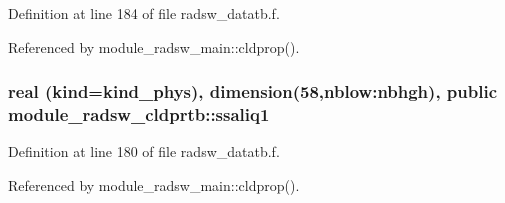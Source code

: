 Definition at line 184 of file radsw\+\_\+datatb.\+f.



Referenced by module\+\_\+radsw\+\_\+main\+::cldprop().

\subsubsection[{\texorpdfstring{ssaliq1}{ssaliq1}}]{\setlength{\rightskip}{0pt plus 5cm}real (kind=kind\+\_\+phys), dimension(58,nblow\+:nbhgh), public module\+\_\+radsw\+\_\+cldprtb\+::ssaliq1}\hypertarget{namespacemodule__radsw__cldprtb_a7944084ba9f240723dc93467ec66f825}{}\label{namespacemodule__radsw__cldprtb_a7944084ba9f240723dc93467ec66f825}


Definition at line 180 of file radsw\+\_\+datatb.\+f.



Referenced by module\+\_\+radsw\+\_\+main\+::cldprop().

